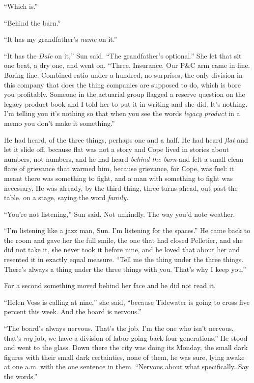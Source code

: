 \documentclass[11pt,openany]{book}
\begin{document}
``Which is.''

``Behind the barn.''

``It has my grandfather's \textit{name} on it.''

``It has the \textit{Dale} on it,'' Sun said. ``The grandfather's optional.'' She let that sit one beat, a dry one, and went on. ``Three. Insurance. Our P\&C arm came in fine. Boring fine. Combined ratio under a hundred, no surprises, the only division in this company that does the thing companies are supposed to do, which is bore you profitably. Someone in the actuarial group flagged a reserve question on the legacy product book and I told her to put it in writing and she did. It's nothing. I'm telling you it's nothing so that when you see the words \textit{legacy product} in a memo you don't make it something.''

He had heard, of the three things, perhaps one and a half. He had heard \textit{flat} and let it slide off, because flat was not a story and Cope lived in stories about numbers, not numbers, and he had heard \textit{behind the barn} and felt a small clean flare of grievance that warmed him, because grievance, for Cope, was fuel: it meant there was something to fight, and a man with something to fight was necessary. He was already, by the third thing, three turns ahead, out past the table, on a stage, saying the word \textit{family.}

``You're not listening,'' Sun said. Not unkindly. The way you'd note weather.

``I'm listening like a jazz man, Sun. I'm listening for the spaces.'' He came back to the room and gave her the full smile, the one that had closed Pelletier, and she did not take it, she never took it before nine, and he loved that about her and resented it in exactly equal measure. ``Tell me the thing under the three things. There's always a thing under the three things with you. That's why I keep you.''

For a second something moved behind her face and he did not read it.

``Helen Voss is calling at nine,'' she said, ``because Tidewater is going to cross five percent this week. And the board is nervous.''

``The board's always nervous. That's the job. I'm the one who isn't nervous, that's \textit{my} job, we have a division of labor going back four generations.'' He stood and went to the glass. Down there the city was doing its Monday, the small dark figures with their small dark certainties, none of them, he was sure, lying awake at one a.m. with the one sentence in them. ``Nervous about what specifically. Say the words.''
\end{document}
